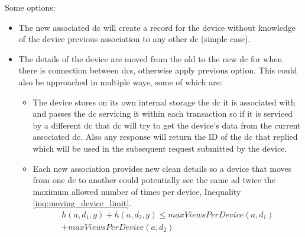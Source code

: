 Some options:
\begin{itemize}
	\item The new associated \gls{dc} will create a record for the device without knowledge of the device previous association to any other \gls{dc} (simple case).
	
	\item The details of the device are moved from the old to the new \gls{dc} for when there is connection between \glspl{dc}, otherwise apply previous option. This could also be approached in multiple ways, some of which are:
	\begin{itemize}
	 	\item  The device stores on its own internal storage the \gls{dc} it is associated with and passes the \gls{dc} servicing it within each transaction so if it is serviced by a different \gls{dc} that \gls{dc} will try to get the device's data from the current associated \gls{dc}. Also any response will return the ID of the \gls{dc} that replied which will be used in the subsequent request submitted by the device.
	 	
	 	\item Each new association provides new clean details so a device that moves from one \gls{dc} to another could potentially see the same ad twice the maximum allowed number of times per device, Inequality \ref{inq:moving_device_limit}.
	 	\begin{multline}
	 		h(a, d_{1}, g) + h(a, d_{2}, g) \le maxViewsPerDevice(a, d_{1}) \\+ maxViewsPerDevice(a, d_{2})
	 		\label{inq:moving_device_limit}
	 	\end{multline}
	\end{itemize}
\end{itemize}
